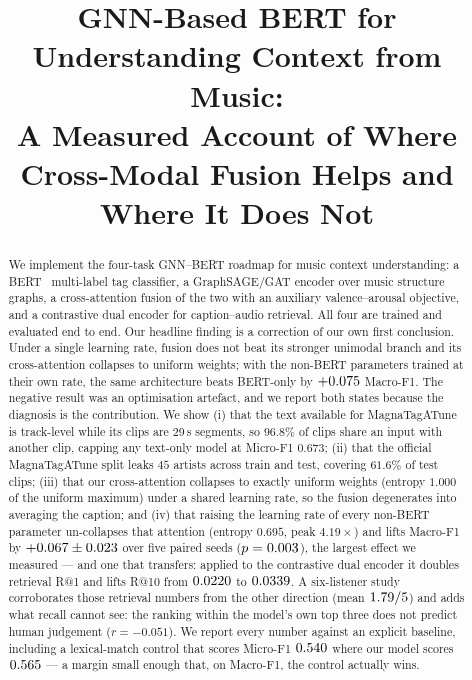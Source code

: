 \documentclass[conference]{IEEEtran}
\title{GNN-Based BERT for Understanding Context from Music:\\
A Measured Account of Where Cross-Modal Fusion Helps and Where It Does Not}
\author{\IEEEauthorblockN{Tanvir Rahman}
\IEEEauthorblockA{Student ID 22241134\\
CSE715 --- Neural Networks, Instructor: Moin Mostakim\\
BRAC University\\
8 September 2026}}
\begin{document}
\maketitle

\begin{abstract}
\noindent
We implement the four-task GNN--BERT roadmap for music context understanding:
a BERT~\cite{bert} multi-label tag classifier, a GraphSAGE/GAT encoder over music
structure graphs, a cross-attention fusion of the two with an auxiliary
valence--arousal objective, and a contrastive dual encoder for
caption--audio retrieval. All four are trained and evaluated end to end.
Our headline finding is a correction of our own first conclusion. Under a
single learning rate, fusion does not beat its stronger unimodal branch and its
cross-attention collapses to uniform weights; with the non-BERT parameters
trained at their own rate, the same architecture beats BERT-only by
$+0.075$
Macro-F1. The negative result was an optimisation artefact, and we report both
states because the diagnosis is the contribution. We show (i) that the text available for MagnaTagATune is track-level
while its clips are 29\,s segments, so $96.8\%$ of clips share an input with
another clip, capping any text-only model at Micro-F1 $0.673$; (ii) that the
official MagnaTagATune split leaks $45$ artists across train and test,
covering $61.6\%$ of test clips; (iii) that our cross-attention collapses to
exactly uniform weights (entropy $1.000$ of the uniform maximum) under a shared
learning rate, so the fusion degenerates into averaging the caption; and (iv)
that raising the learning rate of every non-BERT parameter un-collapses that attention
(entropy $0.695$, peak $4.19\times$) and lifts Macro-F1 by
$+0.067 \pm 0.023$ over five paired seeds
($p = 0.003$), the largest effect we
measured --- and one that transfers: applied to the contrastive dual encoder it
doubles retrieval R@1 and lifts R@10 from $0.0220$ to
$0.0339$. A six-listener
study corroborates those retrieval numbers from the other direction (mean
$1.79/5$) and adds what recall cannot see: the ranking within the model's own
top three does not predict human judgement ($r = -0.051$).
We report every number against
an explicit baseline, including a lexical-match control that scores Micro-F1
$0.540$ where our model scores $0.565$ --- a margin small enough that, on
Macro-F1, the control actually wins.
\end{abstract}
\end{document}
